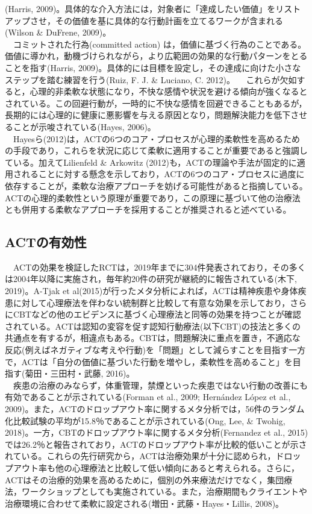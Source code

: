 \documentclass[12pt,a4paper,xelatex,ja=standard]{bxjsarticle}
\begin{document}
(Harris,
2009)。具体的な介入方法には，対象者に「達成したい価値」をリストアップさせ，その価値を基に具体的な行動計画を立てるワークが含まれる(Wilson
\& DuFrene, 2009)。\\
　コミットされた行為(committed action)
は，価値に基づく行為のことである。価値に導かれ，動機づけられながら，より広範囲の効果的な行動パターンをとることを指す(Harris,
2009)。具体的には目標を設定し，その達成に向けた小さなステップを踏む練習を行う(Ruiz,
F. J. \& Luciano, C. 2012)。
　これらが欠如すると，心理的非柔軟な状態になり，不快な感情や状況を避ける傾向が強くなるとされている。この回避行動が，一時的に不快な感情を回避できることもあるが，長期的には心理的に健康に悪影響を与える原因となり，問題解決能力を低下させることが示唆されている(Hayes,
2006)。\\
　Hayesら(2012)は，ACTの6つのコア・プロセスが心理的柔軟性を高めるための手段であり，これらを状況に応じて柔軟に適用することが重要であると強調している。加えてLilienfeld
\& Arkowitz
(2012)も，ACTの理論や手法が固定的に適用されることに対する懸念を示しており，ACTの6つのコア・プロセスに過度に依存することが，柔軟な治療アプローチを妨げる可能性があると指摘している。ACTの心理的柔軟性という原理が重要であり，この原理に基づいて他の治療法とも併用する柔軟なアプローチを採用することが推奨されると述べている。

\hypertarget{actux306eux6709ux52b9ux6027}{%
\subsection{ACTの有効性}\label{actux306eux6709ux52b9ux6027}}

　ACTの効果を検証したRCTは，2019年までに304件発表されており，その多くは2004年以降に実施され，毎年約20件の研究が継続的に報告されている(木下,
2019)。A-Tjak et
al(2015)が行ったメタ分析によれば，ACTは精神疾患や身体疾患に対して心理療法を伴わない統制群と比較して有意な効果を示しており，さらにCBTなどの他のエビデンスに基づく心理療法と同等の効果を持つことが確認されている。ACTは認知の変容を促す認知行動療法(以下CBT)の技法と多くの共通点を有するが，相違点もある。CBTは，問題解決に重点を置き，不適応な反応(例えばネガティブな考えや行動)を「問題」として減らすことを目指す一方で，ACTは「自分の価値に基づいた行動を増やし，柔軟性を高めること」を目指す(菊田・三田村・武藤,
2016)。\\
　疾患の治療のみならず，体重管理，禁煙といった疾患ではない行動の改善にも有効であることが示されている(Forman
et al., 2009; Hernández López et al.,
2009)。また，ACTのドロップアウト率に関するメタ分析では，56件のランダム化比較試験の平均が15.8％であることが示されている(Ong,
Lee, \& Twohig,
2018)。一方，CBTのドロップアウト率に関するメタ分析(Fernandez et al.,
2015)では26.2％と報告されており，ACTのドロップアウト率が比較的低いことが示されている。これらの先行研究から，ACTは治療効果が十分に認められ，ドロップアウト率も他の心理療法と比較して低い傾向にあると考えられる。さらに，ACTはその治療的効果を高めるために，個別の外来療法だけでなく，集団療法，ワークショップとしても実施されている。また，治療期間もクライエントや治療環境に合わせて柔軟に設定される(増田・武藤・Hayes・Lillis,
2008)。
\end{document}
